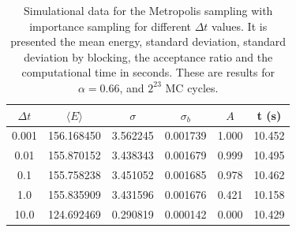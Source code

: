 \documentclass[aps,reprint,superscriptaddress,nofootinbib]{revtex4-2}
\begin{document}
    \begingroup
    \setlength{\tabcolsep}{4pt} %
    \renewcommand{\arraystretch}{1.25} %
    \begin{table}[]
        \caption{Simulational data for the Metropolis sampling with importance sampling for different \(\Delta t\) values. It is presented the mean energy, standard deviation, standard deviation by blocking, the acceptance ratio and the computational time in seconds. These are results for \(\alpha = 0.66\), and \(2^{23}\) MC cycles.}
        \begin{tabular}{c||ccccc}
            \(\Delta t\) & \(\langle E \rangle\) & \(\sigma\) & \(\sigma_b\) & \(A\) & t (s) \\ \hline \hline
            0.001 & 156.168450 & 3.562245 & 0.001739 & 1.000 & 10.452 \\
            0.01 & 155.870152 & 3.438343 & 0.001679 & 0.999 & 10.495 \\
            0.1 & 155.758238 & 3.451052 & 0.001685 & 0.978 & 10.462 \\
            1.0 & 155.835909 & 3.431596 & 0.001676 & 0.421 & 10.158 \\
            10.0 & 124.692469 & 0.290819 & 0.000142 & 0.000 & 10.429
        \end{tabular}
        \label{tab:import}
    \end{table}
    \endgroup

    
\end{document}

